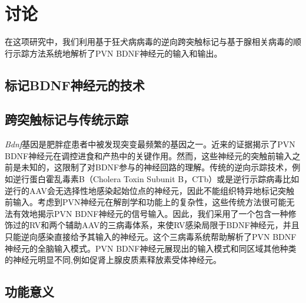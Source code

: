 \chapter{讨论}\label{chap:discussion}
在这项研究中，我们利用基于狂犬病病毒的逆向跨突触标记与基于腺相关病毒的顺行示踪方法系统地解析了PVN BDNF神经元的输入和输出。

\section{标记BDNF神经元的技术}


\section{跨突触标记与传统示踪}
\textit{Bdnf}基因是肥胖症患者中被发现突变最频繁的基因之一。近来的证据揭示了PVN BDNF神经元在调控进食和产热中的关键作用。然而，这些神经元的突触前输入之前是未知的，这限制了对BDNF参与的神经回路的理解。传统的逆向示踪技术，例如逆行蛋白霍乱毒素B（Cholera Toxin Subunit B，CTb）\citep{conte2009multiple}或是逆行示踪病毒比如逆行的AAV\citep{tervo2016designer}会无选择性地感染起始位点的神经元，因此不能组织特异地标记突触前输入。考虑到PVN神经元在解剖学和功能上的复杂性，这些传统方法很可能无法有效地揭示PVN BDNF神经元的信号输入。因此，我们采用了一个包含一种修饰过的RV和两个辅助AAV的三病毒体系，来使RV感染局限于BDNF神经元，并且只能逆向感染直接给予其输入的神经元。这个三病毒系统帮助解析了PVN BDNF神经元的全脑输入模式。PVN BDNF神经元展现出的输入模式和同区域其他种类的神经元明显不同,例如促肾上腺皮质素释放素受体神经元\citep{jiang2018local}。

\section{功能意义}